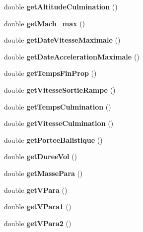 \begin{DoxyCompactItemize}
double {\bfseries get\+Altitude\+Culmination} ()
\item 
\mbox{\label{classpackage_i_h_m_1_1_fusee_a4764587470f7deab8f4738bea5ecf067}} 
double {\bfseries get\+Mach\+\_\+max} ()
\item 
\mbox{\label{classpackage_i_h_m_1_1_fusee_a5e292a5c436c8a7d2325f41ca323e0ea}} 
double {\bfseries get\+Date\+Vitesse\+Maximale} ()
\item 
\mbox{\label{classpackage_i_h_m_1_1_fusee_aba5822efc15396d0c978f71777cb187d}} 
double {\bfseries get\+Date\+Acceleration\+Maximale} ()
\item 
\mbox{\label{classpackage_i_h_m_1_1_fusee_ab5ef8a4e7e00ede675f2b8ed78e30505}} 
double {\bfseries get\+Temps\+Fin\+Prop} ()
\item 
\mbox{\label{classpackage_i_h_m_1_1_fusee_a8bee21c341bae021f584ad310b0ff69f}} 
double {\bfseries get\+Vitesse\+Sortie\+Rampe} ()
\item 
\mbox{\label{classpackage_i_h_m_1_1_fusee_a262179da88718476dfa7f9085aed44bf}} 
double {\bfseries get\+Temps\+Culmination} ()
\item 
\mbox{\label{classpackage_i_h_m_1_1_fusee_a95ff15476f93d411cf04fca67f6756b2}} 
double {\bfseries get\+Vitesse\+Culmination} ()
\item 
\mbox{\label{classpackage_i_h_m_1_1_fusee_ae9bc0685a063a007055f8395aacb3b2a}} 
double {\bfseries get\+Portee\+Balistique} ()
\item 
\mbox{\label{classpackage_i_h_m_1_1_fusee_ab693f7b8a6db9d4c7f112a4dd2d094ac}} 
double {\bfseries get\+Duree\+Vol} ()
\item 
\mbox{\label{classpackage_i_h_m_1_1_fusee_a28633a472bfd8c406c8c6d0b53dab006}} 
double {\bfseries get\+Masse\+Para} ()
\item 
\mbox{\label{classpackage_i_h_m_1_1_fusee_ac461ab2a6086285d105ff579f98ffe80}} 
double {\bfseries get\+V\+Para} ()
\item 
\mbox{\label{classpackage_i_h_m_1_1_fusee_a02bc51e970a959aeff2c9b05cce2c564}} 
double {\bfseries get\+V\+Para1} ()
\item 
\mbox{\label{classpackage_i_h_m_1_1_fusee_a92c7ba71a122f2b8d528a097fc0ef6e0}} 
double {\bfseries get\+V\+Para2} ()
\end{DoxyCompactItemize}
